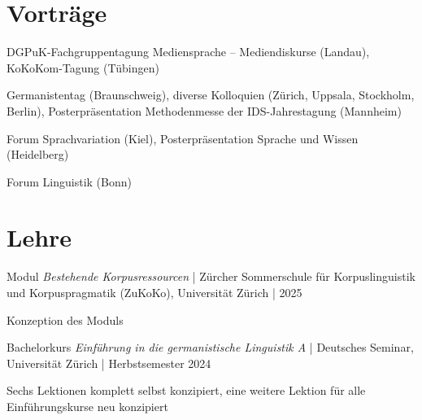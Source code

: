\documentclass[11pt, a4paper, notopicbreak, titleabove]{simplecv}
\begin{document}
\section{Vorträge}

\begin{topic}

	\item[2026]
	DGPuK-Fachgruppentagung Mediensprache – Mediendiskurse (Landau), KoKoKom-Tagung (Tübingen)

	\item[2025]
	Germanistentag (Braunschweig), diverse Kolloquien (Zürich, Uppsala, Stockholm, Berlin), Posterpräsentation Methodenmesse der IDS-Jahrestagung (Mannheim)

	\item[2024]
	Forum Sprachvariation (Kiel), Posterpräsentation Sprache und Wissen (Heidelberg)

	\item[2021]
	Forum Linguistik (Bonn)

\end{topic}



\section{Lehre}

\begin{topic}

	\item[Dozentin]
	Modul \textit{Bestehende Korpusressourcen} {\color{SpotColor}|} Zürcher Sommerschule für Korpuslinguistik und Korpuspragmatik (ZuKoKo), Universität Zürich {\color{SpotColor}|} 2025
	\par
	\begingroup
		\color{QueenslandGrey}\small%
		Konzeption des Moduls \par
	\endgroup

	\item[Dozentin]
	Bachelorkurs \textit{Einführung in die germanistische Linguistik A} {\color{SpotColor}|} Deutsches Seminar, Universität Zürich {\color{SpotColor}|} Herbstsemester 2024 \par
	\begingroup
		\color{QueenslandGrey}\small%
		Sechs Lektionen komplett selbst konzipiert, eine weitere Lektion für alle Einführungskurse neu konzipiert \par
	\endgroup

\end{topic}
\end{document}
